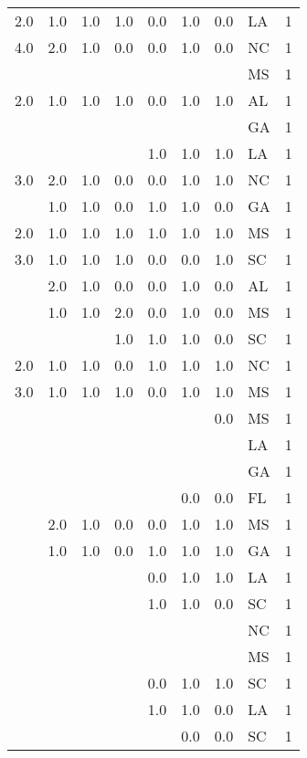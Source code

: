 \begin{tabular}{llllllllr}
2.0 & 1.0 & 1.0 & 1.0 & 0.0 & 1.0 & 0.0 & LA &     1 \\
4.0 & 2.0 & 1.0 & 0.0 & 0.0 & 1.0 & 0.0 & NC &     1 \\
    &     &     &     &     &     &     & MS &     1 \\
2.0 & 1.0 & 1.0 & 1.0 & 0.0 & 1.0 & 1.0 & AL &     1 \\
    &     &     &     &     &     &     & GA &     1 \\
    &     &     &     & 1.0 & 1.0 & 1.0 & LA &     1 \\
3.0 & 2.0 & 1.0 & 0.0 & 0.0 & 1.0 & 1.0 & NC &     1 \\
    & 1.0 & 1.0 & 0.0 & 1.0 & 1.0 & 0.0 & GA &     1 \\
2.0 & 1.0 & 1.0 & 1.0 & 1.0 & 1.0 & 1.0 & MS &     1 \\
3.0 & 1.0 & 1.0 & 1.0 & 0.0 & 0.0 & 1.0 & SC &     1 \\
    & 2.0 & 1.0 & 0.0 & 0.0 & 1.0 & 0.0 & AL &     1 \\
    & 1.0 & 1.0 & 2.0 & 0.0 & 1.0 & 0.0 & MS &     1 \\
    &     &     & 1.0 & 1.0 & 1.0 & 0.0 & SC &     1 \\
2.0 & 1.0 & 1.0 & 0.0 & 1.0 & 1.0 & 1.0 & NC &     1 \\
3.0 & 1.0 & 1.0 & 1.0 & 0.0 & 1.0 & 1.0 & MS &     1 \\
    &     &     &     &     &     & 0.0 & MS &     1 \\
    &     &     &     &     &     &     & LA &     1 \\
    &     &     &     &     &     &     & GA &     1 \\
    &     &     &     &     & 0.0 & 0.0 & FL &     1 \\
    & 2.0 & 1.0 & 0.0 & 0.0 & 1.0 & 1.0 & MS &     1 \\
    & 1.0 & 1.0 & 0.0 & 1.0 & 1.0 & 1.0 & GA &     1 \\
    &     &     &     & 0.0 & 1.0 & 1.0 & LA &     1 \\
    &     &     &     & 1.0 & 1.0 & 0.0 & SC &     1 \\
    &     &     &     &     &     &     & NC &     1 \\
    &     &     &     &     &     &     & MS &     1 \\
    &     &     &     & 0.0 & 1.0 & 1.0 & SC &     1 \\
    &     &     &     & 1.0 & 1.0 & 0.0 & LA &     1 \\
    &     &     &     &     & 0.0 & 0.0 & SC &     1 \\

\end{tabular}
